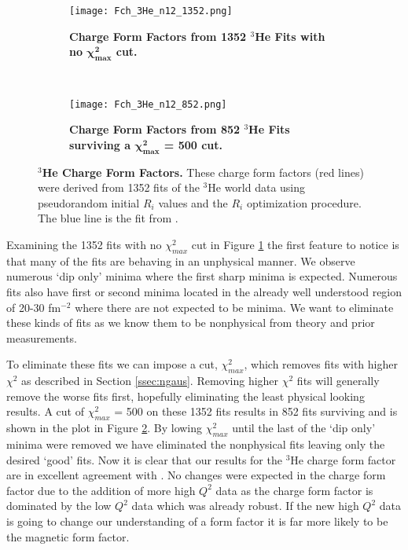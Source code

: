 \begin{figure}[!ht]
\begin{subfigure}{1.\textwidth}
  \centering
  \texttt{[image: Fch\_3He\_n12\_1352.png]}
  \caption{\bf{Charge Form Factors from 1352 $^3$He Fits with no $\boldsymbol{\chi^2_{max}}$ cut.}}
  \label{fig:3he_fch_no_cut}
\end{subfigure}\\
\begin{subfigure}{1.\textwidth}
  \centering
  \texttt{[image: Fch\_3He\_n12\_852.png]}
  \caption{\bf{Charge Form Factors from 852 $^3$He Fits surviving a $\boldsymbol{\chi^2_{max}}$ = 500 cut.}}
  \label{fig:3he_fch_cut}
\end{subfigure}
\caption[$^3$He Charge Form Factors] {
{\bf{$^3$He Charge Form Factors.}} These charge form factors (red lines) were derived from 1352 fits of the $^3$He world data using pseudorandom initial $R_i$ values and the $R_i$ optimization procedure. The blue line is the fit from \cite{Article:Amroun}.}
\label{fig:3he_fch}
\end{figure}

Examining the 1352 fits with no $\chi^2_{max}$ cut in Figure \ref{fig:3he_fch_no_cut} the first feature to notice is that many of the fits are behaving in an unphysical manner. We observe numerous `dip only' minima where the first sharp minima is expected. Numerous fits also have first or second minima located in the already well understood region of 20-30 fm$^{-2}$ where there are not expected to be minima. We want to eliminate these kinds of fits as we know them to be nonphysical from theory and prior measurements. 

To eliminate these fits we can impose a cut, $\chi^2_{max}$, which removes fits with higher $\chi^2$ as described in Section \ref{ssec:ngaus}. Removing higher $\chi^2$ fits will generally remove the worse fits first, hopefully eliminating the least physical looking results. A cut of $\chi^2_{max}$ = 500 on these 1352 fits results in 852 fits surviving and is shown in the plot in Figure \ref{fig:3he_fch_cut}. By lowing $\chi^2_{max}$ until the last of the `dip only' minima were removed we have eliminated the nonphysical fits leaving only the desired `good' fits. Now it is clear that our results for the $^3$He charge form factor are in excellent agreement with \cite{Article:Amroun}. No changes were expected in the charge form factor due to the addition of more high $Q^2$ data as the charge form factor is dominated by the low $Q^2$ data which was already robust. If the new high $Q^2$ data is going to change our understanding of a form factor it is far more likely to be the magnetic form factor.

